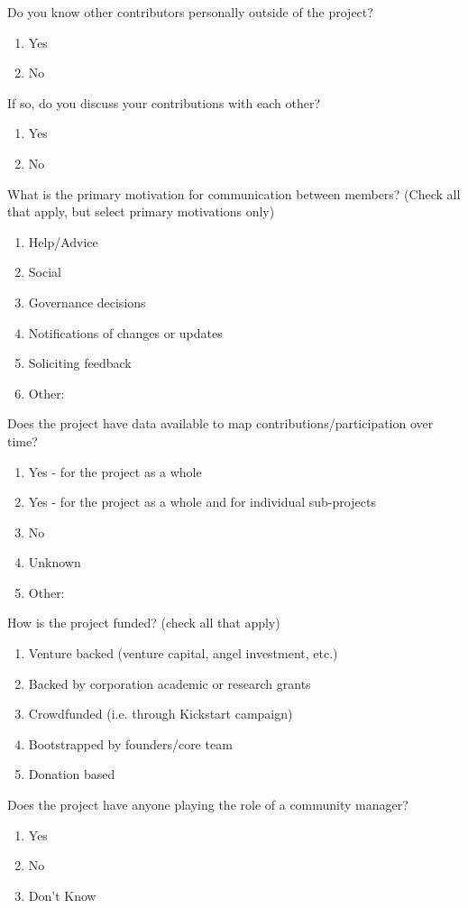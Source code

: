 \begin{table}
Do you know other contributors personally outside of the project?
\begin{enumerate}
\item Yes
\item No
\end{enumerate}

If so, do you discuss your contributions with each other?
\begin{enumerate}
\item Yes
\item No
\end{enumerate}

What is the primary motivation for communication between members? (Check all that apply, but select primary motivations only)
\begin{enumerate}
\item Help/Advice
\item Social
\item Governance decisions
\item Notifications of changes or updates
\item Soliciting feedback
\item Other:
\end{enumerate}

Does the project have data available to map contributions/participation over time?
\begin{enumerate}
\item Yes - for the project as a whole
\item Yes - for the project as a whole and for individual sub-projects
\item No
\item Unknown
\item Other:
\end{enumerate}

How is the project funded? (check all that apply)
\begin{enumerate}
\item Venture backed (venture capital, angel investment, etc.)
\item Backed by corporation academic or research grants
\item Crowdfunded (i.e. through Kickstart campaign)
\item Bootstrapped by founders/core team
\item Donation based
\end{enumerate}

Does the project have anyone playing the role of a community manager?
\begin{enumerate}
\item Yes
\item No
\item Don't Know
\end{enumerate}


\end{table}
